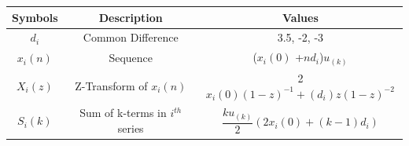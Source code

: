 \documentclass[journal,12pt,twocolumn]{IEEEtran}
\theoremstyle{remark}
\begin{document}
\begin{enumerate}
\vspace{0.05cm}

  \vspace{1cm}
 \begin{center}
\begin{tabular}{ |c|c|c| } 
 \hline
 Symbols & Description & Values    \\
 \hline
  \small $d_i$ & \small Common Difference & 3.5, -2, -3\\
  \small $x_i(n)$ & \small Sequence  &  \scriptsize ($x_i(0)$ +$nd_i$)$u_{(k)}$\\
     \small $X_i(z)$ & \small Z-Transform of $x_i(n)$ & \scriptsize 2$x_i(0)(1-z)^{-1}+(d_i)z(1-z)^{-2}$ \\
     \small $S_i(k)$ & \scriptsize Sum of k-terms in $i^{th}$ series & \scriptsize $\dfrac{ku_{(k)}}{2}(2x_i(0) + (k-1)d_i)$\\
 \hline
\end{tabular}
\centering
\captionsetup{Table 1 : PARAMETERS , DESCRIPTIONS AND VALUES }
\end{center}
\end{enumerate}
\end{document}
